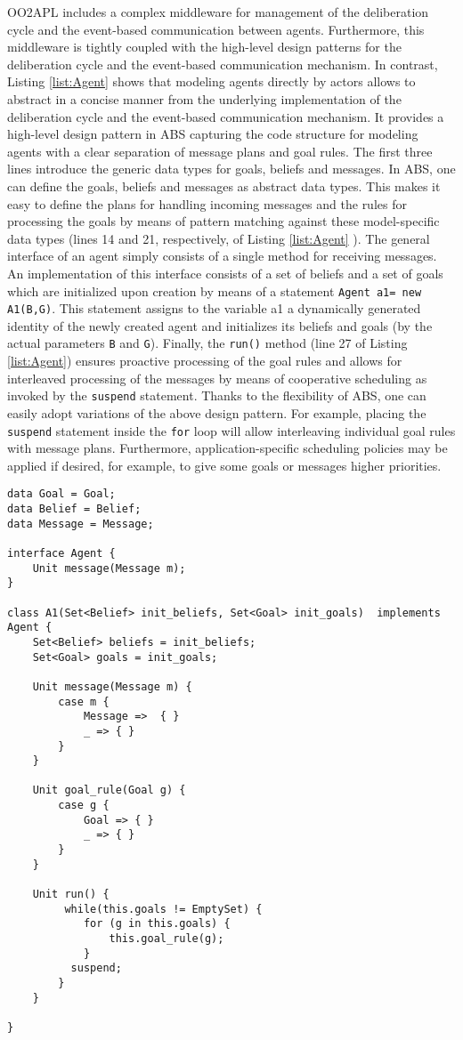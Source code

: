 OO2APL  includes a complex middleware for management of the deliberation cycle and the event-based communication between agents. 
Furthermore, this middleware is tightly coupled with the high-level design patterns for the deliberation cycle and  the event-based communication mechanism.
In contrast,  Listing \ref{list:Agent} shows that modeling agents directly by actors  allows to abstract in a concise manner from the underlying implementation of the deliberation cycle  and the event-based communication mechanism.
It provides  a high-level design pattern in ABS capturing the code structure for modeling agents with a clear separation of message plans and goal rules. 
The first three lines introduce the generic data types for goals, beliefs and messages.
In ABS, one can define the goals, beliefs and messages as abstract data types.
This makes it easy to define the plans for  handling incoming messages and the rules for processing the goals by means of pattern matching against these model-specific data types (lines 14 and 21, respectively, of Listing \ref{list:Agent} ).
The general interface of an agent simply consists of a single method for receiving  messages. An  implementation of this interface consists of a set of beliefs and a set of goals which are initialized upon creation by means of a statement
\lstinline|Agent a1= new A1(B,G)|.
This statement  assigns to the variable a1 a dynamically generated  identity of the newly created agent and initializes its beliefs and goals (by  the actual parameters \lstinline|B| and \lstinline|G|).
Finally,  the \lstinline|run()| method (line 27 of  Listing \ref{list:Agent}) ensures proactive processing of the goal rules and allows for
interleaved processing of the messages by means of cooperative scheduling as invoked by the \lstinline|suspend| statement.
Thanks to the flexibility of ABS, one can easily adopt variations of the above design pattern.
For example, placing the \lstinline|suspend| statement inside the \lstinline|for| loop will allow interleaving individual goal rules with message plans.
Furthermore, application-specific scheduling policies \cite{rabs,cog}  may be applied if desired, for example, to give some goals or messages higher priorities.



\begin{lstlisting}[caption= Generic Agent Model, label=list:Agent]
data Goal = Goal;
data Belief = Belief;
data Message = Message;

interface Agent {
	Unit message(Message m);
}

class A1(Set<Belief> init_beliefs, Set<Goal> init_goals)  implements Agent {
	Set<Belief> beliefs = init_beliefs;
	Set<Goal> goals = init_goals;
	
	Unit message(Message m) {
		case m { 
			Message =>  { }
			_ => { }
		}
	}
	
	Unit goal_rule(Goal g) {
		case g {
			Goal => { }
			_ => { }
		}
	}
	
	Unit run() {
		 while(this.goals != EmptySet) {
  		    for (g in this.goals) {
		        this.goal_rule(g);
		    }
		  suspend;
		}
	}

}

\end{lstlisting}

